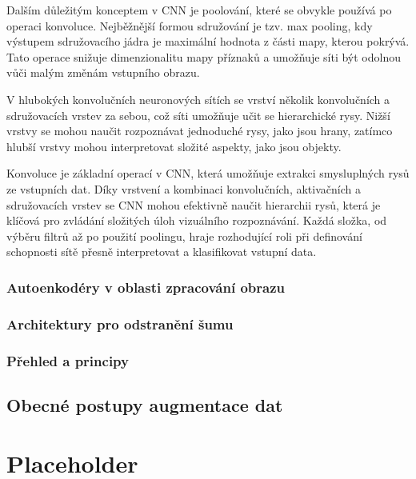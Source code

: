 \documentclass[male,czech,api_ing]{thesis}
\begin{document}
Dalším důležitým konceptem v CNN je poolování, které se obvykle používá po operaci konvoluce. Nejběžnější formou sdružování je tzv. max pooling, kdy výstupem sdružovacího jádra je maximální hodnota z části mapy, kterou pokrývá. Tato operace snižuje dimenzionalitu mapy příznaků a umožňuje síti být odolnou vůči malým změnám vstupního obrazu.

V hlubokých konvolučních neuronových sítích se vrství několik konvolučních a sdružovacích vrstev za sebou, což síti umožňuje učit se hierarchické rysy. Nižší vrstvy se mohou naučit rozpoznávat jednoduché rysy, jako jsou hrany, zatímco hlubší vrstvy mohou interpretovat složité aspekty, jako jsou objekty.

Konvoluce je základní operací v CNN, která umožňuje extrakci smysluplných rysů ze vstupních dat. Díky vrstvení a kombinaci konvolučních, aktivačních a sdružovacích vrstev se CNN mohou efektivně naučit hierarchii rysů, která je klíčová pro zvládání složitých úloh vizuálního rozpoznávání. Každá složka, od výběru filtrů až po použití poolingu, hraje rozhodující roli při definování schopnosti sítě přesně interpretovat a klasifikovat vstupní data. \cite{CNNConcepts, CNNConcepts2}

\subsection{Autoenkodéry v oblasti zpracování obrazu}


\subsection{Architektury pro odstranění šumu}


\subsection{Přehled a principy}

\section{Obecné postupy augmentace dat}

\chapter{Placeholder}

\end{document}
